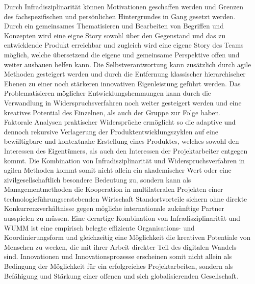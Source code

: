 \documentclass[a4paper,11pt]{article}
\begin{document}
Durch Infradisziplinarität können Motivationen geschaffen werden und Grenzen
des fachspezifischen und persönlichen Hintergrundes in Gang gesetzt
werden. Durch ein gemeinsames Thematisieren und Bearbeiten von Begriffen und
Konzepten wird eine eigne Story sowohl über den Gegenstand und das zu
entwicklende Produkt erreichbar und zugleich wird eine eigene Story des Teams
möglich, welche übersetzend die eigene und gemeinsame Perspektive offen und
weiter ausbauen helfen kann. Die Selbstverantwortung kann zusätzlich durch
agile Methoden gesteigert werden und durch die Entfernung klassischer
hierarchischer Ebenen zu einer noch stärkeren innovativen Eigenleistung
geführt werden. Das Problematisieren möglicher Entwicklungshemmungen kann
durch die Verwandlung in Widerspruchsverfahren noch weiter gesteigert werden
und eine kreatives Potential des Einzelnen, als auch der Gruppe zur Folge
haben. Faktorale Analysen praktischer Widersprüche ermöglicht so die adaptive
und dennoch rekursive Verlagerung der Produktentwicklungszyklen auf eine
bewältigbare und kontextnahe Erstellung eines Produktes, welches sowohl den
Interessen des Eigentümers, als auch den Interessen der Projektarbeiter
entgegen kommt. Die Kombination von Infradisziplinarität und
Widerspruchsverfahren in agilen Methoden kommt somit nicht allein ein
akademischer Wert oder eine zivilgesellschaftlich besondere Bedeutung zu,
sondern kann als Managementmethoden die Kooperation in multilateralen
Projekten einer technologieführungserstebenden Wirtschaft Standortvorteile
sichern ohne direkte Konkurrenzverhältnisse gegen mögliche internationale
zukünftige Partner ausspielen zu müssen. Eine derartige Kombination von
Infradisziplinarität und WUMM ist eine empirisch belegte effiziente
Organisations- und Koordinierungsform und gleichzeitig eine Möglichkeit die
kreativen Potentiale von Menschen zu wecken, die mit ihrer Arbeit direkter
Teil des digitalen Wandels sind. Innovationen und Innovationsprozesse
erscheinen somit nicht allein als Bedingung der Möglichkeit für ein
erfolgreiches Projektarbeiten, sondern als Befähigung und Stärkung einer
offenen und sich globalisierenden Gesellschaft.
\end{document}
